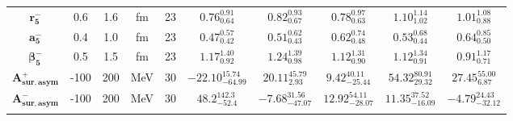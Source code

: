 \begin{tabular}{ c c c c c c c c c c}
$\mathbf{r_{5}^{-}}$ & 0.6 & 1.6 & fm & 23 & $0.76^{0.91}_{0.64}$ & $0.82^{0.93}_{0.67}$ & $0.78^{0.97}_{0.63}$ & $1.10^{1.14}_{1.02}$ & $1.01^{1.08}_{0.88}$\\ 
$\mathbf{a_{5}^{-}}$ & 0.4 & 1.0 & fm & 23 & $0.47^{0.57}_{0.42}$ & $0.51^{0.62}_{0.43}$ & $0.62^{0.74}_{0.48}$ & $0.53^{0.68}_{0.44}$ & $0.64^{0.85}_{0.50}$\\ 
$\mathbf{\beta_{5}^{-}}$ & 0.5 & 1.5 & fm & 23 & $1.17^{1.40}_{0.92}$ & $1.24^{1.39}_{0.98}$ & $1.12^{1.31}_{0.90}$ & $1.12^{1.34}_{0.91}$ & $0.91^{1.17}_{0.71}$\\ 
$\mathbf{A_{sur,asym}^{+}}$ & -100 & 200 & MeV & 30 & $-22.10^{15.74}_{-64.99}$ & $20.11^{45.79}_{2.93}$ & $9.42^{40.11}_{-25.44}$ & $54.32^{80.91}_{29.32}$ & $27.45^{55.00}_{6.87}$\\ 
$\mathbf{A_{sur,asym}^{-}}$ & -100 & 200 & MeV & 30 & $48.2^{142.3}_{-52.4}$ & $-7.68^{31.56}_{-47.07}$ & $12.92^{54.11}_{-28.07}$ & $11.35^{37.52}_{-16.09}$ & $-4.79^{24.43}_{-32.12}$\\ 
\\ 
\end{tabular}
\egroup